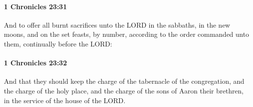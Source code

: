 		\paragraph{1 Chronicles 23:31} %
			\label{1CHRONICLES-23-31}

			And to offer all burnt sacrifices unto the LORD in the sabbaths, in the new moons, and on the set feasts, by number, according to the order commanded unto them, continually before the LORD:


		\paragraph{1 Chronicles 23:32} %
			\label{1CHRONICLES-23-32}

			And that they should keep the charge of the tabernacle of the congregation, and the charge of the holy place, and the charge of the sons of Aaron their brethren, in the service of the house of the LORD.

